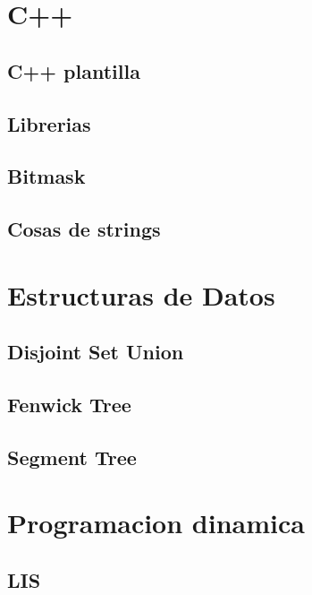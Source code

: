 \section{C++}
\subsection{C++ plantilla}
\raggedbottom
\hrulefill
\subsection{Librerias}
\raggedbottom
\hrulefill
\subsection{Bitmask}
\raggedbottom
\hrulefill
\subsection{Cosas de strings}
\raggedbottom
\hrulefill

\section{Estructuras de Datos}
\subsection{Disjoint Set Union}
\raggedbottom
\hrulefill
\subsection{Fenwick Tree}
\raggedbottom
\hrulefill
\subsection{Segment Tree}
\raggedbottom
\hrulefill

\section{Programacion dinamica}
\subsection{LIS}
\raggedbottom
\hrulefill
